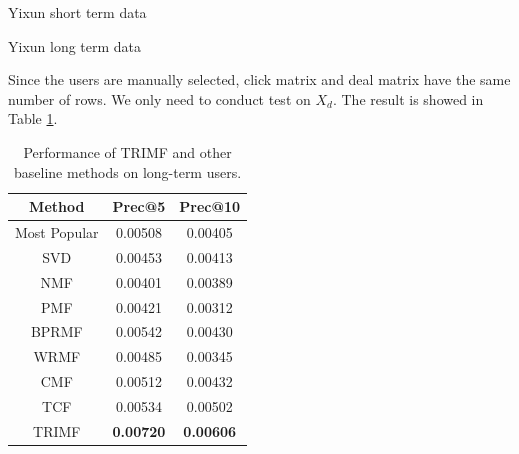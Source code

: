 \begin{subsubsection}{Yixun short term data}
\begin{table}
\end{table}
\end{subsubsection}


\begin{subsubsection}
  {Yixun long term data}
\par{Since the users are manually selected, click matrix and deal matrix have the same number of rows. We only need to conduct test on $X_d$. The result is showed in Table \ref{longterm}.}

\begin{table}
  \centering
  \begin{tabular}{|c|c|c|}
    \hline
    Method&Prec@5&Prec@10\\
    \hline
    Most Popular&0.00508&0.00405\\
    \hline
    SVD&0.00453&0.00413\\
    \hline
    NMF&0.00401&0.00389\\
    \hline
    PMF&0.00421&0.00312\\
    \hline
    BPRMF&0.00542&0.00430\\
    \hline
    WRMF&0.00485&0.00345\\
    \hline
    CMF&0.00512&0.00432\\
    \hline
    TCF&0.00534&0.00502\\
    \hline
    TRIMF&\textbf{\color{red}0.00720}&\textbf{\color{red}0.00606}\\
    \hline
  \end{tabular}
  \caption{Performance of TRIMF and other baseline methods on long-term users.}
\label{longterm}
\end{table}
\end{subsubsection}



